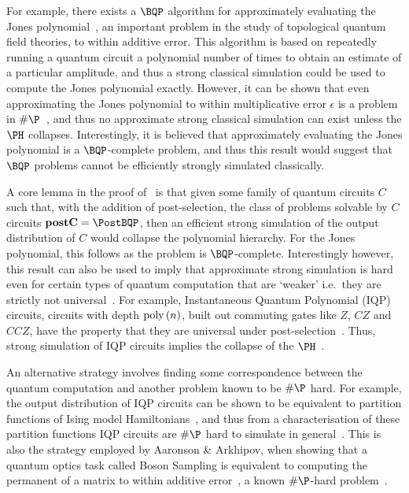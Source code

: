 For example, there exists a $\BQP$ algorithm for approximately evaluating the Jones polynomial~\cite{Aharonov2007}, an important problem in the study of topological quantum field theories, to within additive error. This algorithm is based on repeatedly running a quantum circuit a polynomial number of times to obtain an estimate of a particular amplitude, and thus a strong classical simulation could be used to compute the Jones polynomial exactly. However, it can be shown that even approximating the Jones polynomial to within multiplicative error $\epsilon$ is a problem in $\#\P$~\cite{Kuperberg2009}, and thus no approximate strong classical simulation can exist unless the $\PH$ collapses. Interestingly, it is believed that approximately evaluating the Jones polynomial is a $\BQP$-complete problem, and thus this result would suggest that $\BQP$ problems cannot be efficiently strongly simulated classically.\par
A core lemma in the proof of~\cite{Kuperberg2009} is that given some family of quantum circuits $C$ such that, with the addition of post-selection, the class of problems solvable by $C$ circuits $\mathbf{postC}=\PostBQP$, then an efficient strong simulation of the output distribution of $C$ would collapse the polynomial hierarchy. For the Jones polynomial, this follows as the problem is $\BQP$-complete. Interestingly however, this result can also be used to imply that approximate strong simulation is hard even for certain types of quantum computation that are `weaker' i.e.\ they are strictly not universal~\cite{Aaronson2010}. For example, Instantaneous Quantum Polynomial (IQP) circuits, circuits with depth $\text{poly}\left(n\right)$, built out commuting gates like $Z$, $CZ$ and $CCZ$, have the property that they are universal under post-selection~\cite{Bremner2011}. Thus, strong simulation of IQP circuits implies the collapse of the $\PH$~\cite{Goldberg2014}.\par
An alternative strategy involves finding some correspondence between the quantum computation and another problem known to be $\#\P$ hard. For example, the output distribution of IQP circuits can be shown to be equivalent to partition functions of Ising model Hamiltonians~\cite{Fujii2017}, and thus from a characterisation of these partition functions IQP circuits are $\#\P$ hard to simulate in general~\cite{Goldberg2014}. This is also the strategy employed by Aaronson \& Arkhipov, when showing that a quantum optics task called Boson Sampling is equivalent to computing the permanent of a matrix to within additive error~\cite{Aaronson2010}, a known $\#\P$-hard problem~\cite{Valiant1979}.
